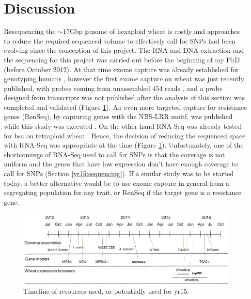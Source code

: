 \section{Discussion} 


Resequencing the $\sim17$Gbp genome of hexaploid wheat is costly and approaches to reduce the required sequenced volume to effectively call for SNPs had been evolving since the conception of this project. 
The RNA and DNA extraction and the sequencing for this project was carried out before the beginning of my PhD (before October 2012). 
At that time exome capture was already established for genotyping humans \citep{Ng2009}, however the first exome capture on wheat was just recently published, with probes coming from unassembled 454 reads \citep{Winfield2012}, and a probe designed from transcripts \citep{Henry2014} was not published after the analysis of this section was completed and validated (Figure \ref{fig:yr15:timeline}).
An even more targeted capture for resistance genes (RenSeq), by capturing genes with the NBS-LRR motif, was published while this study was executed \citep{Jupe2013}.
On the other hand RNA-Seq was already tested for \acrlong{bsa} on tetraploid wheat \citep{Trick2012}.  
Hence, the decision of reducing the sequenced space with RNA-Seq was appropriate at the time (Figure \ref{fig:yr15:timeline}). 
Unfortunately, one of the shortcomings of RNA-Seq used to call for SNPs is that the coverage is not uniform and the genes that have low expression don't have enough coverage to call for SNPs (Section  \ref{yr15:sequencing}).
If a similar study was to be started today, a better alternative would be to use exome capture in general from a segregating population for any trait, or RenSeq if the target gene is a resistance gene. 

\begin{figure}
\includegraphics[width=1\textwidth]{expVIP/Figures/Timeline.pdf}
\caption{Timeline of resources used, or potentially used for \gls{yr15}.}
\label{fig:yr15:timeline}
\end{figure}


